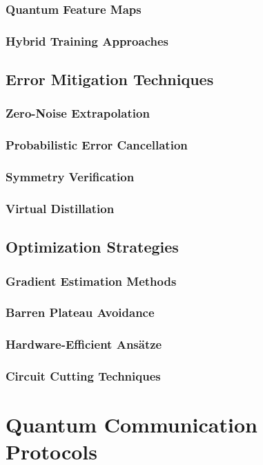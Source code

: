 \documentclass[12pt,a4paper]{book}
\begin{document}
\subsection{Quantum Feature Maps}
\subsection{Hybrid Training Approaches}

\section{Error Mitigation Techniques}
\subsection{Zero-Noise Extrapolation}
\subsection{Probabilistic Error Cancellation}
\subsection{Symmetry Verification}
\subsection{Virtual Distillation}

\section{Optimization Strategies}
\subsection{Gradient Estimation Methods}
\subsection{Barren Plateau Avoidance}
\subsection{Hardware-Efficient Ansätze}
\subsection{Circuit Cutting Techniques}

\chapter{Quantum Communication Protocols}
\end{document}
